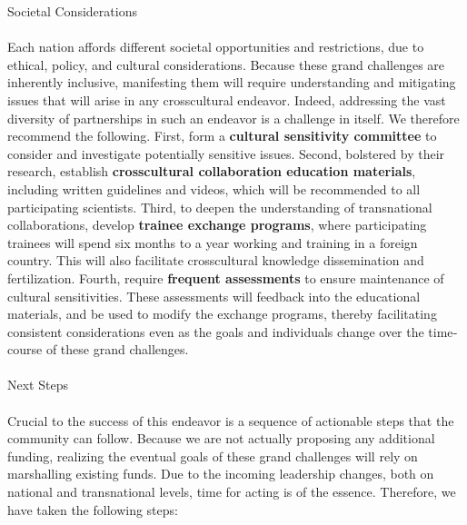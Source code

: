 \documentclass{amsart}
\begin{document}
Societal Considerations \\ \\ 


Each nation affords different societal opportunities and restrictions,
due to ethical, policy, and cultural considerations. Because these grand
challenges are inherently inclusive, manifesting them will require
understanding and mitigating issues that will arise in any
cross­cultural endeavor. Indeed, addressing the vast diversity of
partnerships in such an endeavor is a challenge in itself. We therefore
recommend the following. First, form a {\bf cultural sensitivity committee}
to consider and investigate potentially sensitive issues. Second,
bolstered by their research, establish {\bf cross­cultural collaboration
education materials}, including written guidelines and videos, which will
be recommended to all participating scientists. Third, to deepen the
understanding of transnational collaborations, develop {\bf trainee exchange
programs}, where participating trainees will spend six months to a year
working and training in a
foreign country. This will also facilitate cross­cultural knowledge
dissemination and fertilization. Fourth, require {\bf frequent assessments}
to ensure maintenance of cultural sensitivities. These assessments will
feedback into the educational materials, and be used to modify the
exchange programs, thereby facilitating consistent considerations even
as the goals and individuals change over the time­course of these grand
challenges. \\ \\ 


Next Steps \\ \\ 


Crucial to the success of this endeavor is a sequence of actionable
steps that the community can follow. Because we are not actually
proposing any additional funding, realizing the eventual goals of these
grand challenges will rely on marshalling existing funds. Due to the
incoming leadership changes, both on national and transnational levels,
time for acting is of the essence. Therefore, we have taken the
following steps:
\end{document}
